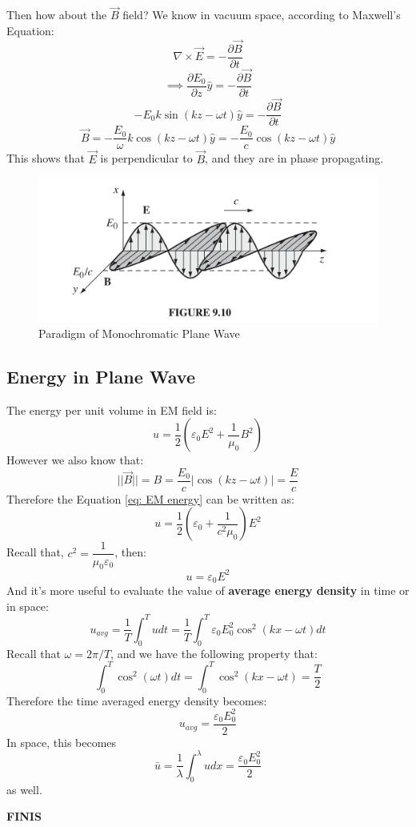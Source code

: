 \documentclass[12pt,a4paper,twoside]{article}
\numberwithin{equation}{section}
\begin{document}
\noindent Then how about the $\overrightarrow{B}$ field? We know in vacuum space, according to Maxwell's Equation:
\[\nabla\times \overrightarrow{E}=-\frac{\partial \overrightarrow{B}}{\partial t}\]
\[\implies \frac{\partial E_0}{\partial z}\hat{y}=-\frac{\partial \overrightarrow{B}}{\partial t}\]
\[-E_0k\sin(kz-\omega t)\hat{y}=-\frac{\partial \overrightarrow{B}}{\partial t}\]
\begin{equation}
    \boxed{\overrightarrow{B}=-\frac{E_0}{\omega}k\cos(kz-\omega t)\hat{y}=-\frac{E_0}{c}\cos(kz-\omega t)\hat{y}}
    \label{eq: B-field-wave}
\end{equation}
This shows that $\overrightarrow{E}$ is perpendicular to $\overrightarrow{B}$, and they are in phase propagating.
\begin{figure}[ht]
    \centering
    \includegraphics[width=12cm]{250-Revision/EMW.png}
    \caption{Paradigm of Monochromatic Plane Wave}
\end{figure}
\subsection{Energy in Plane Wave}
The energy per unit volume in EM field is:
\begin{equation}
    u=\frac{1}{2}(\varepsilon_0E^2+\frac{1}{\mu_0}B^2)
    \label{eq: EM energy}
\end{equation}
However we also know that:
\[||\overrightarrow{B}||=B=\frac{E_0}{c}|\cos(kz-\omega t)|=\frac{E}{c}\]
Therefore the Equation \ref{eq: EM energy} can be written as:
\[u=\frac{1}{2}(\varepsilon_0+\frac{1}{c^2\mu_0})E^2\]
Recall that, $c^2=\dfrac{1}{\mu_0\varepsilon_0}$, then:
\begin{equation}
    u=\varepsilon_0E^2
\end{equation}
And it's more useful to evaluate the value of \textbf{average energy density} in time or in space:
\[u_{avg}=\frac{1}{T}\int_0^Tudt=\frac{1}{T}\int_0^T\varepsilon_0E_0^2\cos^2(kx-\omega t)dt\]
Recall that $\omega=2\pi/T$, and we have the following property that:
\[\int_0^T\cos^2(\omega t)dt=\int_0^{T}\cos^2(kx-\omega t)=\frac{T}{2}\]
Therefore the time averaged energy density becomes:
\begin{equation}
    \boxed{
    u_{avg} = \frac{\varepsilon_0E_0^2}{2}
    }
\end{equation}
In space, this becomes
\[\bar{u}=\frac{1}{\lambda}\int_0^\lambda udx=\frac{\varepsilon_0E_0^2}{2}\]
as well.

\begin{center}
    \LARGE{\textbf{FINIS}}
\end{center}
\end{document}

